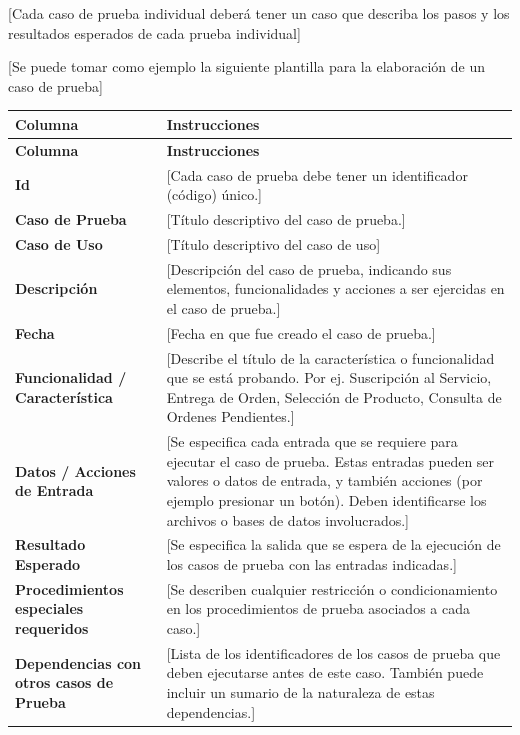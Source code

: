 \documentclass[12pt,letterpaper]{article}
\begin{document}
[Cada caso de prueba individual deberá tener un caso que describa los pasos y los resultados esperados de cada prueba individual]

[Se puede tomar como ejemplo la siguiente plantilla para la elaboración de un caso de prueba]

\begin{center}
\begin{longtable}{|>{\bfseries}p{4.5cm}|p{9.5cm}|}
  \hline
  \textbf{Columna} & \textbf{Instrucciones} \\
  \hline
  \endfirsthead
  \hline
  \textbf{Columna} & \textbf{Instrucciones} \\
  \hline
  \endhead
  Id &
    [Cada caso de prueba debe tener un identificador (código) único.] \\
  \hline
  Caso de Prueba &
    [Título descriptivo del caso de prueba.] \\
  \hline
  Caso de Uso &
    [Título descriptivo del caso de uso] \\
  \hline
  Descripción &
    [Descripción del caso de prueba, indicando sus elementos, funcionalidades y acciones a ser ejercidas en el caso de prueba.] \\
  \hline
  Fecha &
    [Fecha en que fue creado el caso de prueba.] \\
  \hline
  Funcionalidad / Característica &
    [Describe el título de la característica o funcionalidad que se está probando. Por ej. Suscripción al Servicio, Entrega de Orden, Selección de Producto, Consulta de Ordenes Pendientes.] \\
  \hline
  Datos / Acciones de Entrada &
    [Se especifica cada entrada que se requiere para ejecutar el caso de prueba. Estas entradas pueden ser valores o datos de entrada, y también acciones (por ejemplo presionar un botón). Deben identificarse los archivos o bases de datos involucrados.] \\
  \hline
  Resultado Esperado &
    [Se especifica la salida que se espera de la ejecución de los casos de prueba con las entradas indicadas.] \\
  \hline
  Procedimientos especiales requeridos &
    [Se describen cualquier restricción o condicionamiento en los procedimientos de prueba asociados a cada caso.] \\
  \hline
  Dependencias con otros casos de Prueba &
    [Lista de los identificadores de los casos de prueba que deben ejecutarse antes de este caso. También puede incluir un sumario de la naturaleza de estas dependencias.] \\

\end{longtable}
\end{center}
\end{document}
